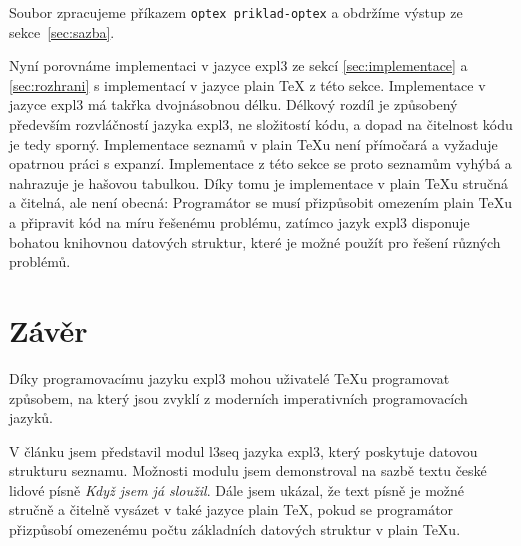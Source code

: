 \documentclass{csbulletin}
\newenvironment{mintedblock}{%
  \par\vspace{\topsep}\vspace{\partopsep}%
  \begingroup
  \fvset{listparameters=\setlength{\topsep}{0pt}\setlength{\partopsep}{0pt}}%
}{%
  \endgroup
  \par\vspace{\topsep}\vspace{\partopsep}%
}
\newcommand\pkg{\textsf}
\begin{document}
\begin{mintedblock}
\inputminted[firstnumber=1]{tex}{example-optex.tex}
\end{mintedblock}

\noindent
Soubor zpracujeme příkazem \texttt{optex priklad-optex} a obdržíme výstup ze sekce~\ref{sec:sazba}.

Nyní porovnáme implementaci v jazyce expl3 ze sekcí \ref{sec:implementace} a \ref{sec:rozhrani} s implementací v jazyce plain \TeX{} z této sekce. Implementace v jazyce expl3 má takřka dvojnásobnou délku. Délkový rozdíl je způsobený především rozvláčností jazyka expl3, ne složitostí kódu, a dopad na čitelnost kódu je tedy sporný. Implementace seznamů v plain \TeX u není přímočará a vyžaduje opatrnou práci s expanzí. Implementace z této sekce se proto seznamům vyhýbá a nahrazuje je hašovou tabulkou. Díky tomu je implementace v plain \TeX u stručná a čitelná, ale není obecná: Programátor se musí přizpůsobit omezením plain \TeX u a připravit kód na míru řešenému problému, zatímco jazyk expl3 disponuje bohatou knihovnou datových struktur, které je možné použít pro řešení různých problémů.

\section{Závěr}
\label{sec:zaver}

Díky programovacímu jazyku expl3 mohou uživatelé \TeX u programovat způsobem, na který jsou zvyklí z moderních imperativních programovacích jazyků.

V článku jsem představil modul \pkg{l3seq} jazyka expl3, který poskytuje datovou strukturu seznamu. Možnosti modulu jsem demonstroval na sazbě textu české lidové písně \emph{Když jsem já sloužil}.
Dále jsem ukázal, že text písně je možné stručně a čitelně vysázet v také jazyce plain \TeX{}, pokud se programátor přizpůsobí omezenému počtu základních datových struktur v plain \TeX u.

\printbibliography
\end{document}
